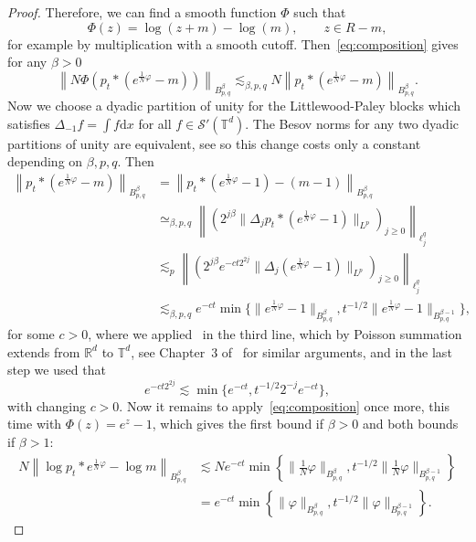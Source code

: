 \documentclass[a4paper,12pt]{article}
\newcommand{\mathd}{\mathrm{d}}
\newcommand{\R}{\mathbb{R}}
\newcommand{\T}{\mathbb{T}}
\begin{document}
\begin{proof}
    Therefore, we can find a smooth function $\Phi$ such that
    \[
        \Phi(z) = \log(z + m) - \log( m),\qquad z \in R-m,
    \]
    for example by multiplication with a smooth cutoff. Then~\eqref{eq:composition} gives for any $\beta>0$
    \[
        \left\|N \Phi \left(p_t \ast \left(e^{\tfrac1N\varphi} - m\right)\right) \right\|_{B^\beta_{p,q}} \lesssim_{\beta,p,q} N \left\|p_t \ast \left(e^{\tfrac1N\varphi} - m\right) \right\|_{B^\beta_{p,q}}.
    \]
    Now we choose a dyadic partition of unity for the Littlewood-Paley blocks which satisfies $\Delta_{-1}f = \int f \mathd x$ for all $f \in \mathcal S'(\T^d)$. The Besov norms for any two dyadic partitions of unity are equivalent, see \cite[Chapter~3.5, Theorem~1]{Schmeisser1987} so this change costs only a constant depending on $\beta,p,q$. Then
    \begin{align*}
        \left\|p_t \ast \left(e^{\tfrac1N\varphi} - m\right)\right\|_{B^\beta_{p,q}} & = \left\| p_t \ast \left(e^{\tfrac1N\varphi} - 1\right) - (m-1)\right\|_{B^\beta_{p,q}} \\
        & \simeq_{\beta,p,q} \left\| \left(2^{j\beta} \|\Delta_j p_t \ast (e^{\tfrac1N\varphi} - 1)\|_{L^p} \right)_{j \geq 0} \right\|_{\ell^q_j} \\
        & \lesssim_p \left\| \left(2^{j\beta} e^{-c t 2^{2j}} \|\Delta_j (e^{\tfrac1N\varphi} - 1)\|_{L^p} \right)_{j \geq 0} \right\|_{\ell^q_j} \\
        & \lesssim_{\beta,p,q} e^{-c t} \min\bigl\{ \|e^{\tfrac1N\varphi}  - 1\|_{B^{\beta}_{p,q}}, t^{-1/2}\|e^{\tfrac1N\varphi}  - 1\|_{B^{\beta-1}_{p,q}} \bigr\},
    \end{align*}
    for some $c>0$, where we applied~\cite[Lemma~2.4]{Bahouri2011} in the third line, which by Poisson summation extends from $\R^d$ to $\T^d$, see Chapter~3 of~\cite{Gubinelli2015EBP} for similar arguments, and in the last step we used that
    \[
        e^{-c t 2^{2j}} \lesssim \min\{e^{-ct}, t^{-1/2} 2^{-j} e^{-ct}\},
    \]
    with changing $c>0$. Now it remains to apply~\eqref{eq:composition} once more, this time with $\Phi(z) = e^z-1$, which gives the first bound if $\beta>0$ and both bounds if $\beta>1$:
    \begin{align}\nonumber
        N \left\| \log p_t \ast e^{\tfrac1N\varphi} - \log m\right\|_{B^\beta_{p,q}} & \lesssim N e^{-c t} \min\left\{\|\frac1N\varphi\|_{B^\beta_{p,q}}, t^{-1/2} \|\frac1N\varphi\|_{B^{\beta-1}_{p,q}}\right\} \\
        & = e^{-ct} \min\left\{\|\varphi\|_{B^\beta_{p,q}}, t^{-1/2} \|\varphi\|_{B^{\beta-1}_{p,q}}\right\}. \label{eq:CH-regularity-pr1}

\end{align}
\end{proof}
\end{document}
